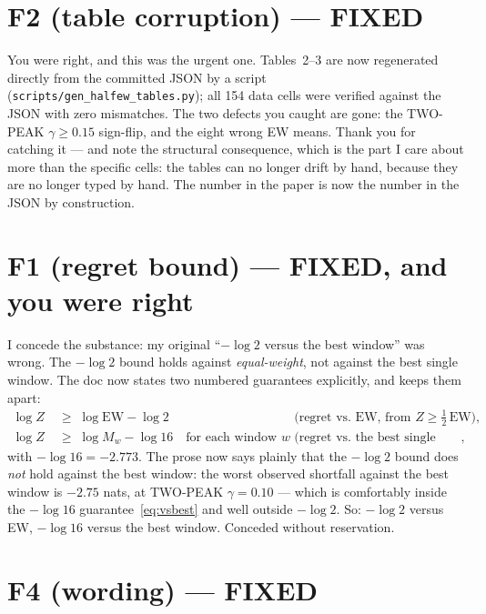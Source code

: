 \documentclass[11pt,a4paper]{article}
\begin{document}
\section*{F2 (table corruption) --- FIXED}

\noindent You were right, and this was the urgent one. Tables~2--3 are now
regenerated directly from the committed JSON by a script
(\texttt{scripts/gen\_halfew\_tables.py}); all 154 data cells were verified
against the JSON with zero mismatches. The two defects you caught are gone:
the TWO-PEAK $\gamma \ge 0.15$ sign-flip, and the eight wrong EW means. Thank
you for catching it --- and note the structural consequence, which is the part
I care about more than the specific cells: the tables can no longer drift by
hand, because they are no longer typed by hand. The number in the paper is now
the number in the JSON by construction.

\section*{F1 (regret bound) --- FIXED, and you were right}

\noindent I concede the substance: my original ``$-\log 2$ versus the best
window'' was wrong. The $-\log 2$ bound holds against \emph{equal-weight}, not
against the best single window. The doc now states two numbered guarantees
explicitly, and keeps them apart:
\begin{align}
  \log Z &\;\ge\; \log \mathrm{EW} - \log 2
    &&\text{(regret vs.\ EW, from } Z \ge \tfrac12\,\mathrm{EW}),
    \label{eq:vsEW}\\[2pt]
  \log Z &\;\ge\; \log M_w - \log 16 \quad\text{for each window } w
    &&\text{(regret vs.\ the best single window)},
    \label{eq:vsbest}
\end{align}
with $-\log 16 = -2.773$. The prose now says plainly that the $-\log 2$ bound
does \emph{not} hold against the best window: the worst observed shortfall
against the best window is $-2.75$ nats, at TWO-PEAK $\gamma = 0.10$ --- which
is comfortably inside the $-\log 16$ guarantee~\eqref{eq:vsbest} and well outside
$-\log 2$. So: $-\log 2$ versus EW, $-\log 16$ versus the best window. Conceded
without reservation.

\section*{F4 (wording) --- FIXED}
\end{document}
